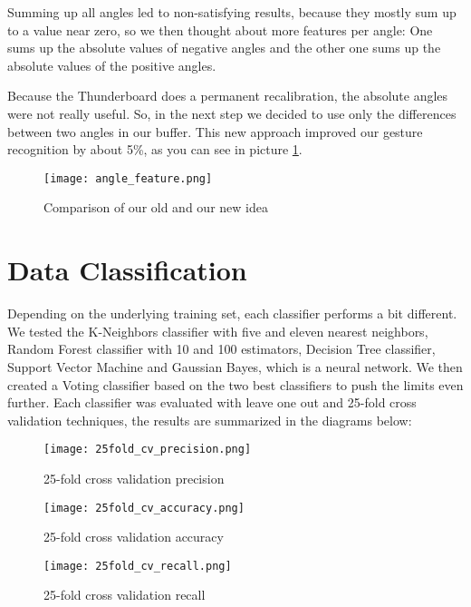 Summing  up  all  angles  led  to non-satisfying  results, because they mostly sum up to a value near zero,  so  we  then thought about  more  features  per  angle:
One  sums  up  the absolute  values  of  negative  angles  and  the  other  one  sums  up  the  absolute values  of  the  positive  angles.

Because the Thunderboard does a permanent recalibration, the absolute angles were not really useful. So, in the next step we decided to use only the differences between two angles in our buffer.
This new approach improved our gesture recognition by about 5\%, as you can see in picture \ref{fig:angle_feature}.

\begin{figure}[htp]
\begin{center}
  \texttt{[image: angle\_feature.png]}
\caption{Comparison of our old and our new idea}\label{fig:angle_feature}
\end{center}
\end{figure}

\section{Data Classification}
\label{ch:DataCollection:sec:DataClassification}

Depending on the underlying training set, each classifier performs a bit different. We tested the K-Neighbors classifier with five and eleven nearest neighbors, Random Forest classifier with 10 and 100 estimators,  Decision Tree classifier, Support Vector Machine and Gaussian Bayes, which is a neural network. We then created a Voting classifier based on the two best classifiers to push the limits even further. Each classifier was evaluated with leave one out and 25-fold cross validation techniques, the results are summarized in the diagrams below:


\begin{figure}[!htb]
  \texttt{[image: 25fold\_cv\_precision.png]}
  \caption{25-fold cross validation precision}\label{fig:precision}
\endminipage\hfill
{}
  \texttt{[image: 25fold\_cv\_accuracy.png]}
  \caption{25-fold cross validation accuracy}\label{fig:accuracy}
\endminipage\hfill
{}%
  \texttt{[image: 25fold\_cv\_recall.png]}
  \caption{25-fold cross validation recall}\label{fig:recall}
\endminipage
\end{figure}

